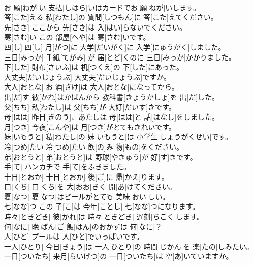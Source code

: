 \documentclass[8pt]{extreport}
\begin{document}
\begin{CJK}{UTF8}{min}
\\	お 願[ねが]い	支払[しはら]いはカードでお 願[ねが]いします。		
\\	答[こた]える	私[わたし]の 質問[しつもん]に 答[こた]えてください。		
\\	先[さき]	ここから 先[さき]は 入[はい]らないでください。		
\\	寒[さむ]い	この 部屋[へや]は 寒[さむ]いです。		
\\	四[し]	四[し] 月[がつ]に 大学[だいがく]に 入学[にゅうがく]しました。		
\\	三日[みっか]	手紙[てがみ] が 届[とど]くのに 三日[みっか]かかりました。		
\\	下[した]	財布[さいふ]は 机[つくえ]の 下[した]にあった。		
\\	大丈夫[だいじょうぶ]	大丈夫[だいじょうぶ]ですか。		
\\	大人[おとな]	お 酒[さけ]は 大人[おとな]になってから。		
\\	出[だ]す	彼[かれ]はかばんから 教科書[きょうかしょ]を 出[だ]した。		
\\	父[ちち]	私[わたし]は 父[ちち]が 大好[だいす]きです。		
\\	母[はは]	昨日[きのう]、あたしは 母[はは]と 話[はなし]をしました。		
\\	月[つき]	今夜[こんや]は 月[つき]がとてもきれいです。		
\\	妹[いもうと]	私[わたし]の 妹[いもうと]は 小学生[しょうがくせい]です。		
\\	冷[つめ]たい	冷[つめ]たい 飲[の]み 物[もの]をください。		
\\	弟[おとうと]	弟[おとうと]は 野球[やきゅう]が 好[す]きです。		
\\	手[て]	ハンカチで 手[て]をふきました。		
\\	十日[とおか]	十日[とおか] 後[ご]に 帰[かえ]ります。		
\\	口[くち]	口[くち]を 大[おお]きく 開[あ]けてください。		
\\	夏[なつ]	夏[なつ]はビールがとても 美味[おい]しい。		
\\	七[なな]つ	この 子[こ]は 今年[ことし] 七[なな]つになります。		
\\	時々[ときどき]	彼[かれ]は 時々[ときどき] 遅刻[ちこく]します。		
\\	何[なに]	晩[ばん]ご 飯[はん]のおかずは 何[なに]？		
\\	人[ひと]	プールは 人[ひと]でいっぱいです。		
\\	一人[ひとり]	今日[きょう]は 一人[ひとり]の 時間[じかん]を 楽[たの]しみたい。		
\\	一日[ついたち]	来月[らいげつ]の 一日[ついたち]は 空[あ]いていますか。		

\end{CJK}
\end{document}
